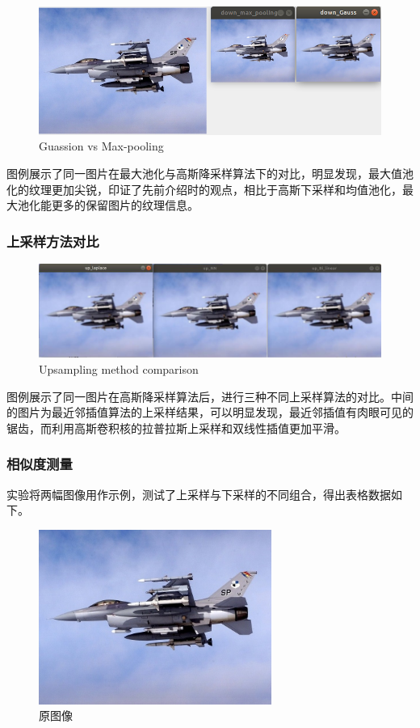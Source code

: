 \documentclass[12pt]{article}
\begin{document}
	\begin{figure}[H]
		\centering
		\includegraphics[width=6in]{./1.png}
		\centering
		\caption{Guassion vs Max-pooling}
	\end{figure}
	图例展示了同一图片在最大池化与高斯降采样算法下的对比，明显发现，最大值池化的纹理更加尖锐，印证了先前介绍时的观点，相比于高斯下采样和均值池化，最大池化能更多的保留图片的纹理信息。
	
	\subsubsection{上采样方法对比}
	
	\begin{figure}[H]
		\centering
		\includegraphics[width=6in]{./2.png}
		\centering
		\caption{Upsampling method comparison}
	\end{figure}

	图例展示了同一图片在高斯降采样算法后，进行三种不同上采样算法的对比。中间的图片为最近邻插值算法的上采样结果，可以明显发现，最近邻插值有肉眼可见的锯齿，而利用高斯卷积核的拉普拉斯上采样和双线性插值更加平滑。
	
	\subsubsection{相似度测量}
	实验将两幅图像用作示例，测试了上采样与下采样的不同组合，得出表格数据如下。
	
	\begin{figure}[H]
		\centering
		\includegraphics[width=3in]{./airplane.jpg}
		\centering
		\caption{原图像}
	\end{figure}
	
\end{document}
